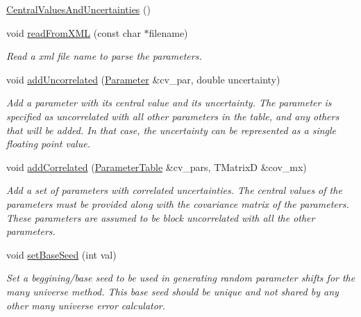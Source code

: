 \begin{DoxyCompactItemize}
\item 
\hyperlink{class_neutrino_flux_reweight_1_1_central_values_and_uncertainties_ac3a73eb67a543921780ddeab498b2cbb}{Central\-Values\-And\-Uncertainties} ()
\item 
void \hyperlink{class_neutrino_flux_reweight_1_1_central_values_and_uncertainties_ad33ef7303d8224e8d55717dfa144999a}{read\-From\-X\-M\-L} (const char $\ast$filename)
\begin{DoxyCompactList}\small\item\em Read a xml file name to parse the parameters. \end{DoxyCompactList}\item 
void \hyperlink{class_neutrino_flux_reweight_1_1_central_values_and_uncertainties_a90995e11727bdcddcd18f912374f0aeb}{add\-Uncorrelated} (\hyperlink{namespace_neutrino_flux_reweight_aa1e1a244ea4addfb793b4e316e6c0a72}{Parameter} \&cv\-\_\-par, double uncertainty)
\begin{DoxyCompactList}\small\item\em Add a parameter with its central value and its uncertainty. The parameter is specified as uncorrelated with all other parameters in the table, and any others that will be added. In that case, the uncertainty can be represented as a single floating point value. \end{DoxyCompactList}\item 
void \hyperlink{class_neutrino_flux_reweight_1_1_central_values_and_uncertainties_a90fa6710f3f5baff82308b1a50dc9eff}{add\-Correlated} (\hyperlink{class_neutrino_flux_reweight_1_1_parameter_table}{Parameter\-Table} \&cv\-\_\-pars, T\-Matrix\-D \&cov\-\_\-mx)
\begin{DoxyCompactList}\small\item\em Add a set of parameters with correlated uncertainties. The central values of the parameters must be provided along with the covariance matrix of the parameters. These parameters are assumed to be block uncorrelated with all the other parameters. \end{DoxyCompactList}\item 
void \hyperlink{class_neutrino_flux_reweight_1_1_central_values_and_uncertainties_ab1fb22693b182fc4ed740fafe38644a2}{set\-Base\-Seed} (int val)
\begin{DoxyCompactList}\small\item\em Set a beggining/base seed to be used in generating random parameter shifts for the many universe method. This base seed should be unique and not shared by any other many universe error calculator. \end{DoxyCompactList}\item 

\end{DoxyCompactItemize}
